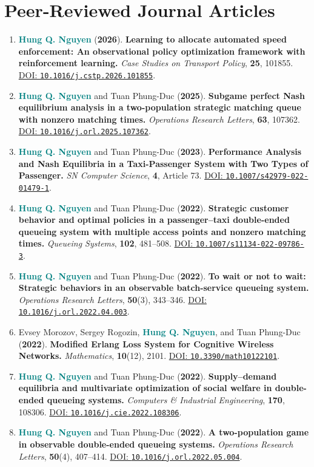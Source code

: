 \documentclass[10pt,a4paper]{article}
\newcommand{\myname}{\textbf{\textcolor{Teal}{Hung Q. Nguyen}}}
\newcommand{\papertitle}[1]{\textbf{#1}}
\newcommand{\doilink}[1]{\href{https://doi.org/#1}{DOI: \nolinkurl{#1}}}
\newenvironment{publicationlist}{%
  \begin{enumerate}[
    label=\textcolor{Gold}{\bfseries\arabic*.},
    leftmargin=2.1em,
    labelsep=0.55em,
    itemsep=6pt,
    topsep=2pt,
    parsep=0pt,
    partopsep=0pt
  ]\small
}{\end{enumerate}}
\begin{document}
\section{Peer-Reviewed Journal Articles}
\begin{publicationlist}
  \item \myname{} (\textbf{2026}). \papertitle{Learning to allocate automated speed enforcement: An observational policy optimization framework with reinforcement learning.} \emph{Case Studies on Transport Policy}, \textbf{25}, 101855. \doilink{10.1016/j.cstp.2026.101855}.

  \item \myname{} and Tuan Phung-Duc (\textbf{2025}). \papertitle{Subgame perfect Nash equilibrium analysis in a two-population strategic matching queue with nonzero matching times.} \emph{Operations Research Letters}, \textbf{63}, 107362. \doilink{10.1016/j.orl.2025.107362}.

  \item \myname{} and Tuan Phung-Duc (\textbf{2023}). \papertitle{Performance Analysis and Nash Equilibria in a Taxi-Passenger System with Two Types of Passenger.} \emph{SN Computer Science}, \textbf{4}, Article 73. \doilink{10.1007/s42979-022-01479-1}.

  \item \myname{} and Tuan Phung-Duc (\textbf{2022}). \papertitle{Strategic customer behavior and optimal policies in a passenger--taxi double-ended queueing system with multiple access points and nonzero matching times.} \emph{Queueing Systems}, \textbf{102}, 481--508. \doilink{10.1007/s11134-022-09786-3}.

  \item \myname{} and Tuan Phung-Duc (\textbf{2022}). \papertitle{To wait or not to wait: Strategic behaviors in an observable batch-service queueing system.} \emph{Operations Research Letters}, \textbf{50}(3), 343--346. \doilink{10.1016/j.orl.2022.04.003}.

  \item Evsey Morozov, Sergey Rogozin, \myname{}, and Tuan Phung-Duc (\textbf{2022}). \papertitle{Modified Erlang Loss System for Cognitive Wireless Networks.} \emph{Mathematics}, \textbf{10}(12), 2101. \doilink{10.3390/math10122101}.

  \item \myname{} and Tuan Phung-Duc (\textbf{2022}). \papertitle{Supply--demand equilibria and multivariate optimization of social welfare in double-ended queueing systems.} \emph{Computers \& Industrial Engineering}, \textbf{170}, 108306. \doilink{10.1016/j.cie.2022.108306}.

  \item \myname{} and Tuan Phung-Duc (\textbf{2022}). \papertitle{A two-population game in observable double-ended queueing systems.} \emph{Operations Research Letters}, \textbf{50}(4), 407--414. \doilink{10.1016/j.orl.2022.05.004}.
\end{publicationlist}
\end{document}
